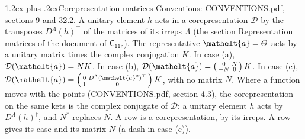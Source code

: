 \documentclass[10pt,a4paper]{article}
\makeatletter
\renewcommand\section{\@startsection{section}{1}{\z@}{-3ex plus -1ex minus -.2ex}%
  {1.2ex plus .2ex}{\normalfont\large\sffamily\bfseries\color{parttitle}}}
\numberwithin{equation}{section}
\newcommand{\eltfont}[1]{{\let\sigma\eltsigma\mathelt{#1}}}
\newcommand{\grp}[1]{\mathsf{#1}}
\newcommand{\elt}[1]{\eltfont{#1}}
\makeatother
\begin{document}
\section{Corepresentation matrices}\label{s:corep_matrices}
Conventions: \href{../../CONVENTIONS.pdf}{CONVENTIONS.pdf}, sections \href{../../../rotation/CONVENTIONS.pdf\#conv.9}{9} and \href{../../CONVENTIONS.pdf\#conv.32.2}{32.2}.
A unitary element $h$ acts in a corepresentation $\mathcal{D}$ by the transposes $D^{\Lambda}(h)^{\top}$ of the matrices of its irreps $\Lambda$ (the section Representation matrices of the document of \href{../../../rotation/data/pdf/C11h.pdf}{$\grp{C_{11h}}$}). The representative $\elt{a} = \varTheta$ acts by a unitary matrix times the complex conjugation $K$.
In case (a), $\mathcal{D}(\elt{a}) = NK$. In case (b), $\mathcal{D}(\elt{a}) = \left(\begin{smallmatrix} 0 & N \\ -N & 0 \end{smallmatrix}\right) K$. In case (c), $\mathcal{D}(\elt{a}) = \left(\begin{smallmatrix} 0 & D^{\Lambda}(\elt{a}^2)^{\top} \\ 1 & 0 \end{smallmatrix}\right) K$, with no matrix $N$.
Where a function moves with the points (\href{../../CONVENTIONS.pdf}{CONVENTIONS.pdf}, section \href{../../../rotation/CONVENTIONS.pdf\#conv.4.3}{4.3}), the corepresentation on the same kets is the complex conjugate of $\mathcal{D}$: a unitary element $h$ acts by $D^{\Lambda}(h)^{\dagger}$, and $N^{*}$ replaces $N$.
A row is a corepresentation, by its irreps. A row gives its case and its matrix $N$ (a dash in case (c)).
\end{document}
